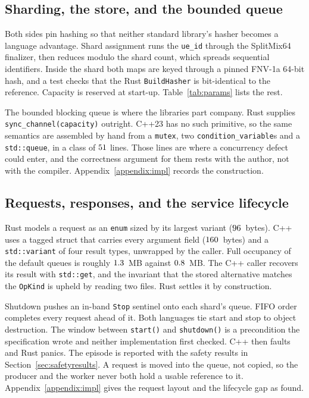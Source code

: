 \documentclass[english,oneside,a4paper,censored,csm,software-track-2020]{HYthesisML}
\begin{document}
\subsection{Sharding, the store, and the bounded queue}
Both sides pin hashing so that neither standard library's hasher becomes a language advantage.
Shard assignment runs the \texttt{ue\_id} through the SplitMix64 finalizer, then reduces modulo
the shard count, which spreads sequential identifiers. Inside the shard both maps are keyed
through a pinned FNV-1a 64-bit hash, and a test checks that the Rust \texttt{BuildHasher} is
bit-identical to the reference. Capacity is reserved at start-up. Table~\ref{tab:params} lists
the rest.

The bounded blocking queue is where the libraries part company. Rust supplies
\texttt{sync\_channel(capacity)} outright. C++23 has no such primitive, so the same semantics
are assembled by hand from a \texttt{mutex}, two \texttt{condition\_variable}s and a
\texttt{std::queue}, in a class of $51$ lines. Those lines are where a
concurrency defect could enter, and the correctness argument for them rests with the author,
not with the compiler. Appendix~\ref{appendix:impl} records the construction.

\subsection{Requests, responses, and the service lifecycle}\label{sec:tagged}
\label{sec:request}
Rust models a request as an \texttt{enum} sized by its largest variant
($96$~bytes). C++ uses a tagged struct that carries every argument field
($160$~bytes) and a \texttt{std::variant} of four result types, unwrapped by the
caller. Full occupancy of the default queues is roughly $1.3$~MB against
$0.8$~MB. The C++ caller recovers its result with \texttt{std::get}, and the
invariant that the stored alternative matches the \texttt{OpKind} is upheld by reading two
files. Rust settles it by construction.

Shutdown pushes an in-band \texttt{Stop} sentinel onto each shard's queue. FIFO order completes
every request ahead of it. Both languages tie start and stop to object destruction. The window
between \texttt{start()} and \texttt{shutdown()} is a precondition the specification wrote and
neither implementation first checked. C++ then faults and Rust panics. The episode is reported
with the safety results in Section~\ref{sec:safetyresults}.
A request is moved into the queue, not copied, so the producer and the worker never both hold a
usable reference to it. Appendix~\ref{appendix:impl} gives the request layout and the lifecycle
gap as found.
\end{document}
